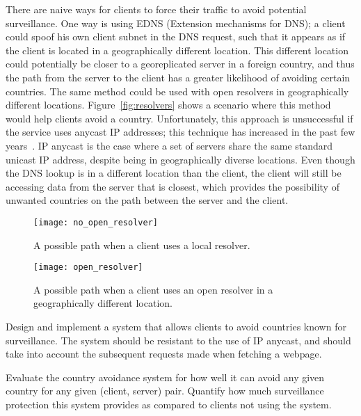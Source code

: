 There are naive ways for clients to force their traffic to avoid potential surveillance.  One way is using EDNS (Extension mechanisms for DNS); a client could spoof his own client subnet in the DNS request, such that it appears as if the client is located in a geographically different location.  This different location could potentially be closer to a georeplicated server in a foreign country, and thus the path from the server to the client has a greater likelihood of avoiding certain countries.  The same method could be used with open resolvers in geographically different locations.  Figure~\ref{fig:resolvers} shows a scenario where this method would help clients avoid a country.  Unfortunately, this approach is unsuccessful if the service uses anycast IP addresses; this technique has increased in the past few years~\cite{cicalese2015characterizing}.  IP anycast is the case where a set of servers share the same standard unicast IP address, despite being in geographically diverse locations.  Even though the DNS lookup is in a different location than the client, the client will still be accessing data from the server that is closest, which provides the possibility of unwanted countries on the path between the server and the client.  

\begin{figure*}
\centering
\begin{subfigure}[t]{.5\textwidth}
  \centering
  \texttt{[image: no\_open\_resolver]}
  \caption{A possible path when a client uses a local resolver.}
  \label{fig:local_resolver}
\end{subfigure}%
\begin{subfigure}[t]{.5\textwidth}
  \centering
  \texttt{[image: open\_resolver]}
  \caption{A possible path when a client uses an open resolver in a geographically different location.}
  \label{fig:open_resolver}
\end{subfigure}%
\caption{Different paths are shown when a client uses a local resolver (Figure~\ref{fig:local_resolver}) vs. a geographically distant open resolver (Figure~\ref{fig:open_resolver}.)}
\label{fig:resolvers}
\end{figure*}

\begin{thm}
Design and implement a system that allows clients to avoid countries known for surveillance.  The system should be resistant to the use of IP anycast, and should take into account the subsequent requests made when fetching a webpage.
\end{thm}

\begin{thm}
Evaluate the country avoidance system for how well it can avoid any given country for any given (client, server) pair.  Quantify how much surveillance protection this system provides as compared to clients not using the system.
\end{thm}
